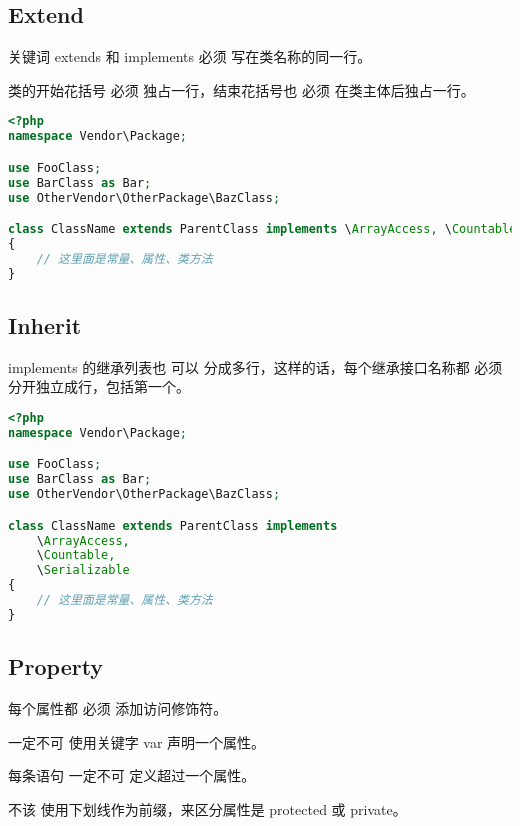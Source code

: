 \subsection{Extend}

关键词 extends 和 implements 必须 写在类名称的同一行。

类的开始花括号 必须 独占一行，结束花括号也 必须 在类主体后独占一行。

\begin{lstlisting}[language=PHP]
<?php
namespace Vendor\Package;

use FooClass;
use BarClass as Bar;
use OtherVendor\OtherPackage\BazClass;

class ClassName extends ParentClass implements \ArrayAccess, \Countable
{
    // 这里面是常量、属性、类方法
}
\end{lstlisting}

\subsection{Inherit}


implements 的继承列表也 可以 分成多行，这样的话，每个继承接口名称都 必须 分开独立成行，包括第一个。

\begin{lstlisting}[language=PHP]
<?php
namespace Vendor\Package;

use FooClass;
use BarClass as Bar;
use OtherVendor\OtherPackage\BazClass;

class ClassName extends ParentClass implements
    \ArrayAccess,
    \Countable,
    \Serializable
{
    // 这里面是常量、属性、类方法
}
\end{lstlisting}

\subsection{Property}

\begin{compactitem}
\item 每个属性都 必须 添加访问修饰符。

\item 一定不可 使用关键字 var 声明一个属性。

\item 每条语句 一定不可 定义超过一个属性。

\item 不该 使用下划线作为前缀，来区分属性是 protected 或 private。

\end{compactitem}




